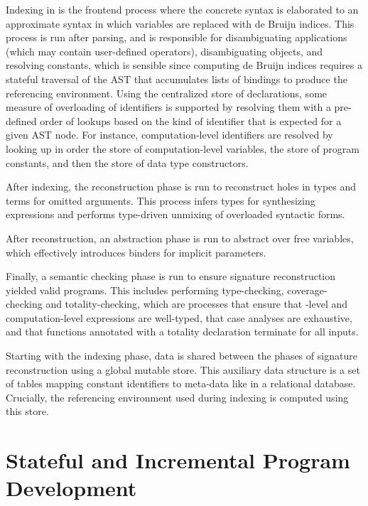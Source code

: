 Indexing in \Beluga is the frontend process where the concrete syntax is elaborated to an approximate syntax in which variables are replaced with de Bruijn indices.
This process is run after parsing, and is responsible for disambiguating applications (which may contain user-defined operators), disambiguating \LF objects, and resolving constants, which is sensible since computing de Bruijn indices requires a stateful traversal of the \ac{AST} that accumulates lists of bindings to produce the referencing environment.
Using the centralized store of declarations, some measure of overloading of identifiers is supported by resolving them with a pre-defined order of lookups based on the kind of identifier that is expected for a given \ac{AST} node.
For instance, computation-level identifiers are resolved by looking up in order the store of computation-level variables, the store of program constants, and then the store of data type constructors.

After indexing, the reconstruction phase is run to reconstruct holes in types and terms for omitted arguments.
This process infers types for synthesizing expressions and performs type-driven unmixing of overloaded syntactic forms.

After reconstruction, an abstraction phase is run to abstract over free variables, which effectively introduces binders for implicit parameters.

Finally, a semantic checking phase is run to ensure signature reconstruction yielded valid programs.
This includes performing type-checking, coverage-checking and totality-checking, which are processes that ensure that \LF-level and computation-level expressions are well-typed, that case analyses are exhaustive, and that functions annotated with a totality declaration terminate for all inputs.

Starting with the indexing phase, data is shared between the phases of signature reconstruction using a global mutable store.
This auxiliary data structure is a set of tables mapping constant identifiers to meta-data like in a relational database.
Crucially, the referencing environment used during indexing is computed using this store.



\section{Stateful and Incremental Program Development}

